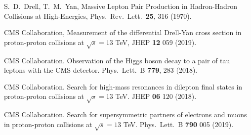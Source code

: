 \documentclass[a4paper,10pt,english]{article}
\begin{document}
\vspace{-0.5cm}
\begin{thebibliography}{References}
S.\ D.\ Drell, T.\ M.\ Yan, Massive Lepton Pair Production in Hadron-Hadron Collisions at High-Energies,
Phys.\ Rev.\ Lett.\ \textbf{25}, 316 (1970).

CMS Collaboration, Measurement of the differential Drell-Yan cross section in proton-proton collisions
at $\sqrt{s}=13$ TeV, JHEP \textbf{12} 059 (2019).

CMS Collaboration. Observation of the Higgs boson decay to a pair of tau leptons with the CMS detector.
Phys.\ Lett.\ B \textbf{779}, 283 (2018).

CMS Collaboration. Search for high-mass resonances in dilepton final states in proton-proton collisions
at $\sqrt{s}=13$ TeV. JHEP \textbf{06} 120 (2018).

CMS Collaboration. Search for supersymmetric partners of electrons and muons in proton-proton collisions
at $\sqrt{s}=13$ TeV. Phys.\ Lett.\ B \textbf{790} 005 (2019).
\end{thebibliography}
\end{document}
